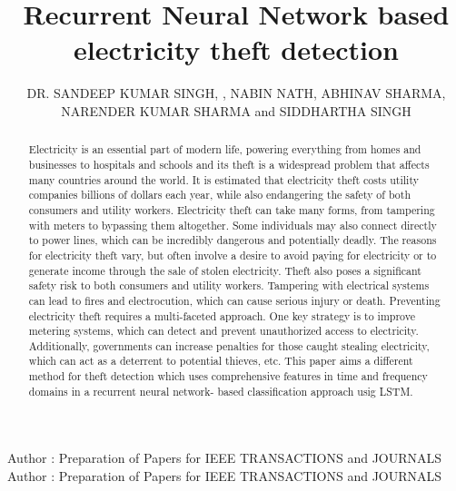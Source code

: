 \documentclass{ieeeaccess}
\begin{document}

\title{Recurrent Neural Network based electricity theft detection}
\author{\uppercase{Dr. Sandeep Kumar Singh}, ,
\uppercase{Nabin Nath}, \uppercase{Abhinav Sharma}, \uppercase{Narender Kumar Sharma} and \uppercase{Siddhartha Singh}}

\address[1]{National Institute of Technology, Hamirpur, Himachal Pradesh, India}
\address[2]{Department of Electronics and Communication, Engineering, National Institute of Technology, Hamirpur, India}

\markboth
{Author \headeretal: Preparation of Papers for IEEE TRANSACTIONS and JOURNALS}
{Author \headeretal: Preparation of Papers for IEEE TRANSACTIONS and JOURNALS}



\begin{abstract}
Electricity is an essential part of modern life, powering everything from homes and businesses
to hospitals and schools and its theft is a widespread problem that affects many countries around the world. It
is estimated that electricity theft costs utility companies billions of dollars each year, while also endangering
the safety of both consumers and utility workers. Electricity theft can take many forms, from tampering with
meters to bypassing them altogether. Some individuals may also connect directly to power lines, which can
be incredibly dangerous and potentially deadly. The reasons for electricity theft vary, but often involve a
desire to avoid paying for electricity or to generate income through the sale of stolen electricity. Theft also
poses a significant safety risk to both consumers and utility workers. Tampering with electrical systems can
lead to fires and electrocution, which can cause serious injury or death. Preventing electricity theft requires
a multi-faceted approach. One key strategy is to improve metering systems, which can detect and prevent
unauthorized access to electricity. Additionally, governments can increase penalties for those caught stealing
electricity, which can act as a deterrent to potential thieves, etc. This paper aims a different method for theft
detection which uses comprehensive features in time and frequency domains in a recurrent neural network-
based classification approach usig LSTM.
\end{abstract}
\end{document}
